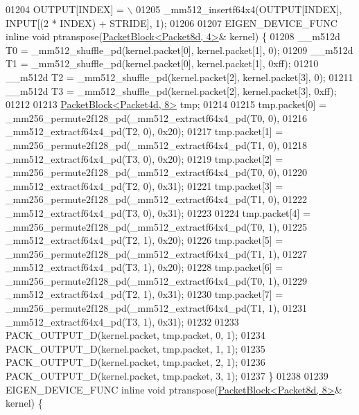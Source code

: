 \begin{DoxyCode}
01204 \textcolor{preprocessor}{  OUTPUT[INDEX] =                                                           \(\backslash\)}
01205 \textcolor{preprocessor}{      \_mm512\_insertf64x4(OUTPUT[INDEX], INPUT[(2 * INDEX) + STRIDE], 1);}
01206 
01207 EIGEN\_DEVICE\_FUNC \textcolor{keyword}{inline} \textcolor{keywordtype}{void} ptranspose(\hyperlink{struct_eigen_1_1internal_1_1_packet_block}{PacketBlock<Packet8d, 4>}& kernel) \{
01208   \_\_m512d T0 = \_mm512\_shuffle\_pd(kernel.packet[0], kernel.packet[1], 0);
01209   \_\_m512d T1 = \_mm512\_shuffle\_pd(kernel.packet[0], kernel.packet[1], 0xff);
01210   \_\_m512d T2 = \_mm512\_shuffle\_pd(kernel.packet[2], kernel.packet[3], 0);
01211   \_\_m512d T3 = \_mm512\_shuffle\_pd(kernel.packet[2], kernel.packet[3], 0xff);
01212 
01213   \hyperlink{struct_eigen_1_1internal_1_1_packet_block}{PacketBlock<Packet4d, 8>} tmp;
01214 
01215   tmp.packet[0] = \_mm256\_permute2f128\_pd(\_mm512\_extractf64x4\_pd(T0, 0),
01216                                          \_mm512\_extractf64x4\_pd(T2, 0), 0x20);
01217   tmp.packet[1] = \_mm256\_permute2f128\_pd(\_mm512\_extractf64x4\_pd(T1, 0),
01218                                          \_mm512\_extractf64x4\_pd(T3, 0), 0x20);
01219   tmp.packet[2] = \_mm256\_permute2f128\_pd(\_mm512\_extractf64x4\_pd(T0, 0),
01220                                          \_mm512\_extractf64x4\_pd(T2, 0), 0x31);
01221   tmp.packet[3] = \_mm256\_permute2f128\_pd(\_mm512\_extractf64x4\_pd(T1, 0),
01222                                          \_mm512\_extractf64x4\_pd(T3, 0), 0x31);
01223 
01224   tmp.packet[4] = \_mm256\_permute2f128\_pd(\_mm512\_extractf64x4\_pd(T0, 1),
01225                                          \_mm512\_extractf64x4\_pd(T2, 1), 0x20);
01226   tmp.packet[5] = \_mm256\_permute2f128\_pd(\_mm512\_extractf64x4\_pd(T1, 1),
01227                                          \_mm512\_extractf64x4\_pd(T3, 1), 0x20);
01228   tmp.packet[6] = \_mm256\_permute2f128\_pd(\_mm512\_extractf64x4\_pd(T0, 1),
01229                                          \_mm512\_extractf64x4\_pd(T2, 1), 0x31);
01230   tmp.packet[7] = \_mm256\_permute2f128\_pd(\_mm512\_extractf64x4\_pd(T1, 1),
01231                                          \_mm512\_extractf64x4\_pd(T3, 1), 0x31);
01232 
01233   PACK\_OUTPUT\_D(kernel.packet, tmp.packet, 0, 1);
01234   PACK\_OUTPUT\_D(kernel.packet, tmp.packet, 1, 1);
01235   PACK\_OUTPUT\_D(kernel.packet, tmp.packet, 2, 1);
01236   PACK\_OUTPUT\_D(kernel.packet, tmp.packet, 3, 1);
01237 \}
01238 
01239 EIGEN\_DEVICE\_FUNC \textcolor{keyword}{inline} \textcolor{keywordtype}{void} ptranspose(\hyperlink{struct_eigen_1_1internal_1_1_packet_block}{PacketBlock<Packet8d, 8>}& kernel) \{

\end{DoxyCode}
